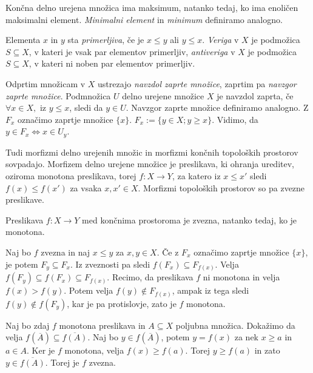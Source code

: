 \documentclass[mat1]{fmfdelo}
\begin{document}
Končna delno urejena množica ima maksimum, natanko tedaj, ko ima enoličen maksimalni element. \textit{Minimalni element} in \textit{minimum} definiramo analogno.

Elementa $x$ in $y$ sta \textit{primerljiva}, če je $x\leq y$ ali $y\leq x$. \textit{Veriga} v $X$ je podmožica $S\subseteq X$, v kateri je vsak par elementov primerljiv, \textit{antiveriga} v $X$ je podmožica $S\subseteq X$, v kateri ni noben par elementov primerljiv. 

Odprtim množicam v $X$ ustrezajo \textit{navzdol zaprte množice}, zaprtim pa \textit{navzgor zaprte množice}. Podmnožica $U$
 delno urejene množice $X$ je navzdol zaprta, če $\forall x\in X,$ iz $y\leq x$, sledi da $y\in U$. Navzgor zaprte množice definiramo analogno.
Z $F_x$ označimo zaprtje množice $\{x\}$. $F_x:=\{y\in X; y\geq x\}$. Vidimo, da $y\in F_x \Leftrightarrow x\in U_y$.

Tudi morfizmi delno urejenih množic in morfizmi končnih topoloških prostorov sovpadajo.
  Morfizem delno urejene množice je preslikava, ki ohranja ureditev, oziroma monotona preslikava, torej $f\colon  X\rightarrow Y$, 
  za katero iz $x\leq x'$ sledi $f(x)\leq f(x')$ za vsaka $x,x'\in X$. Morfizmi topoloških prostorov so pa zvezne preslikave.

\begin{trditev}
Preslikava $f\colon X\rightarrow Y$ med končnima prostoroma je zvezna, natanko tedaj, ko je monotona.
\end{trditev}

%

\begin{dokaz}
    Naj bo $f$ zvezna in naj $x\leq y$ za $x, y \in X$. Če z $F_x$ označimo zaprtje množice $\{x\}$, je potem $F_y \subseteq F_x$. Iz zveznosti pa sledi $f(F_x)\subseteq F_{f(x)}$. Velja $f(F_y) \subseteq f(F_x) \subseteq F_{f(x)}$. Recimo, da preslikava $f$ ni monotona in velja $f(x) > f(y)$. Potem velja $f(y) \notin F_{f(x)}$, ampak iz tega sledi $f(y) \notin f(F_y)$, kar je pa protislovje, zato je $f$ monotona.


    Naj bo zdaj $f$ monotona preslikava in $A\subseteq X$ poljubna množica. Dokažimo da velja $f(\overline{A}) \subseteq \overline{f(A)}$. Naj bo $y\in f(\overline{A})$, potem $y=f(x)$ za nek $x\geq a$ in $a\in A$. Ker je $f$ monotona, velja $f(x) \geq f(a)$. Torej $y \geq f(a)$ in zato $y\in \overline{f(A)}$. Torej je $f$ zvezna.
\end{dokaz}
\end{document}

